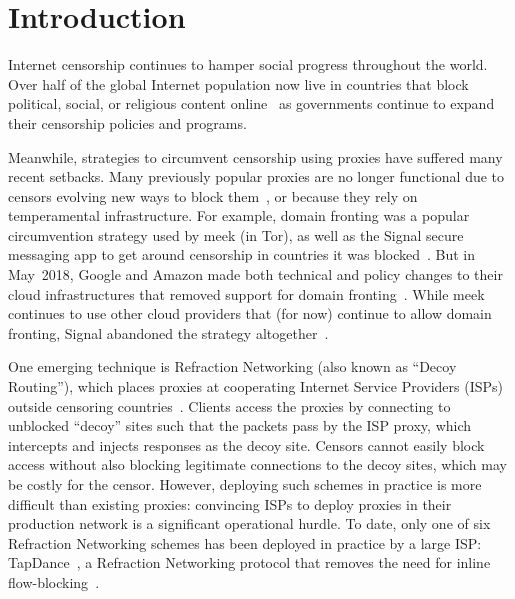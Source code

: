 \documentclass[letterpaper,twocolumn,10pt]{article}
\begin{document}
\FigHighLevel

\section{Introduction}



Internet censorship continues to hamper social progress throughout the world.
Over half of the global Internet population
now live in countries that block political, social, or religious content
online~\cite{fotn2018} as governments continue to expand their censorship
policies and programs.


Meanwhile, strategies to circumvent censorship using proxies have suffered many
recent setbacks. Many previously popular proxies are no longer functional due to
censors evolving new ways to block them~\cite{ensafi-tor,great-cannon},
or because they rely on temperamental
infrastructure. For example, domain fronting was a popular circumvention
strategy used by meek (in Tor), as well as the Signal secure messaging app to
get around censorship in countries it was
blocked~\cite{domain-fronting,signal,signal-domain-fronting}.
But in May~2018, Google and Amazon made both technical and policy changes to
their cloud infrastructures that removed support for domain
fronting~\cite{aws-front}. While meek
continues to use other cloud providers that (for now) continue to allow domain
fronting, Signal abandoned the strategy altogether~\cite{signal-back-on-front}.


One emerging technique is Refraction Networking (also known as ``Decoy
Routing''), which places proxies at cooperating Internet Service Providers
(ISPs) outside censoring countries~\cite{refraction-site}. Clients access the
proxies by connecting to unblocked ``decoy'' sites such that the packets pass by
the ISP proxy, which intercepts and injects responses as the decoy site.
Censors cannot easily block access without also blocking
legitimate connections to the decoy sites, which may be costly for the censor.
However, deploying such schemes in practice is more difficult than existing proxies:
convincing ISPs to deploy proxies in their production network is a significant
operational hurdle. To date, only one of six Refraction
Networking schemes has been deployed in practice by a large ISP:
TapDance~\cite{tadance}, a
Refraction Networking protocol that removes the need for inline
flow-blocking~\cite{frolov2017isp}.
\end{document}

